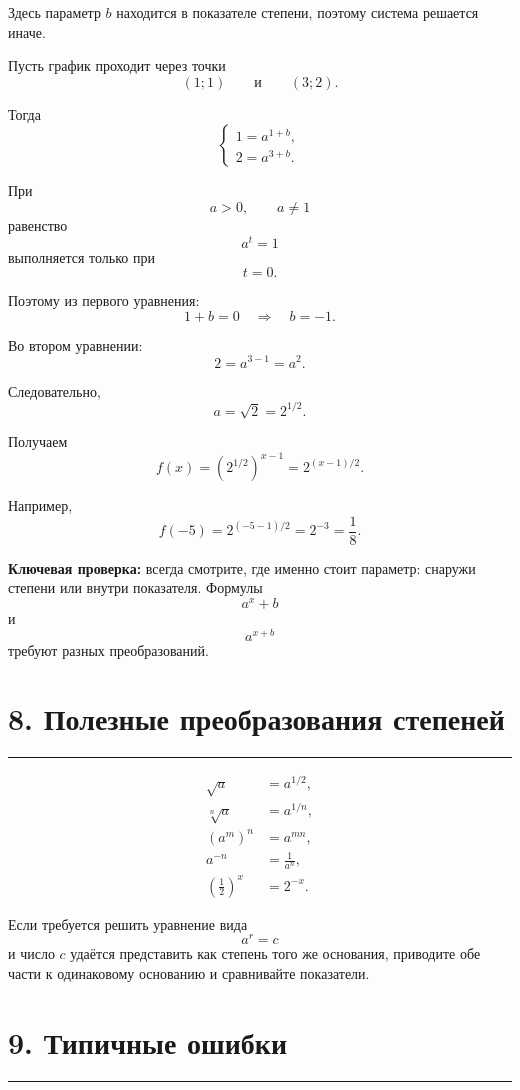 \documentclass[a4paper,12pt]{article}
\newcommand{\sectionline}{%
  \vspace{-0.2em}
  \textcolor{accent}{\rule{\linewidth}{0.5pt}}
  \vspace{0.25em}
}
\newcommand{\key}[1]{\textbf{\textcolor{darkaccent}{#1}}}
\begin{document}
Здесь параметр $b$ находится в показателе степени,
поэтому система решается иначе.

Пусть график проходит через точки
\[
    (1;1)
    \qquad\text{и}\qquad
    (3;2).
\]

Тогда
\[
\begin{cases}
1=a^{1+b},\\
2=a^{3+b}.
\end{cases}
\]

При
\[
    a>0,
    \qquad
    a\ne1
\]
равенство
\[
    a^t=1
\]
выполняется только при
\[
    t=0.
\]

Поэтому из первого уравнения:
\[
1+b=0
\quad\Longrightarrow\quad
b=-1.
\]

Во втором уравнении:
\[
2=a^{3-1}=a^2.
\]

Следовательно,
\[
    a=\sqrt2=2^{1/2}.
\]

Получаем
\[
    f(x)
    =
    \left(2^{1/2}\right)^{x-1}
    =
    2^{(x-1)/2}.
\]

Например,
\[
    f(-5)
    =
    2^{(-5-1)/2}
    =
    2^{-3}
    =
    \frac18.
\]

\key{Ключевая проверка:}
всегда смотрите, где именно стоит параметр:
снаружи степени или внутри показателя.
Формулы
\[
    a^x+b
\]
и
\[
    a^{x+b}
\]
требуют разных преобразований.


\section*{8. Полезные преобразования степеней}
\sectionline

\begin{align*}
\sqrt a
  &=a^{1/2},
\\[2mm]
\sqrt[n]{a}
  &=a^{1/n},
\\[2mm]
\left(a^m\right)^n
  &=a^{mn},
\\[2mm]
a^{-n}
  &=\frac{1}{a^n},
\\[2mm]
\left(\frac12\right)^x
  &=2^{-x}.
\end{align*}

Если требуется решить уравнение вида
\[
    a^r=c
\]
и число $c$ удаётся представить как степень того же основания,
приводите обе части к одинаковому основанию
и сравнивайте показатели.


\section*{9. Типичные ошибки}
\sectionline
\end{document}
